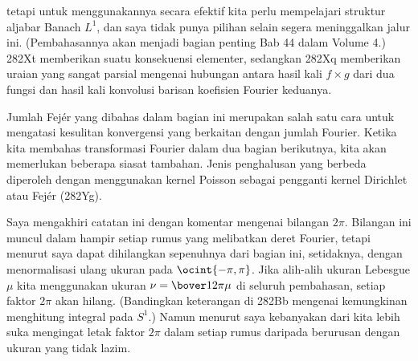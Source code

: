 {

\noindent tetapi untuk menggunakannya secara efektif kita perlu mempelajari struktur
aljabar Banach $L^1$, dan saya tidak punya pilihan selain segera meninggalkan
jalur ini. (Pembahasannya akan menjadi bagian penting Bab 44 dalam
Volume 4.)   282Xt memberikan suatu
konsekuensi elementer, sedangkan 282Xq memberikan uraian yang sangat parsial mengenai
hubungan antara hasil kali $f\times g$ dari dua fungsi dan
hasil kali konvolusi barisan koefisien Fourier keduanya.

Jumlah Fej\'er yang dibahas dalam bagian ini merupakan salah satu cara untuk mengatasi
kesulitan konvergensi yang berkaitan dengan jumlah Fourier.   Ketika
kita membahas transformasi Fourier dalam dua bagian berikutnya, kita akan memerlukan
beberapa siasat tambahan.   Jenis penghalusan yang berbeda
diperoleh dengan menggunakan kernel Poisson sebagai pengganti kernel Dirichlet atau Fej\'er
(282Yg).

Saya mengakhiri catatan ini dengan komentar mengenai bilangan $2\pi$. Bilangan ini muncul dalam
hampir setiap rumus yang melibatkan deret Fourier, tetapi menurut saya dapat
dihilangkan sepenuhnya dari bagian ini, setidaknya, dengan menormalisasi ulang
ukuran pada $\ocint{-\pi,\pi}$. Jika alih-alih ukuran Lebesgue
$\mu$ kita menggunakan ukuran $\nu=\bover1{2\pi}\mu$ di seluruh pembahasan, setiap faktor
$2\pi$ akan hilang. (Bandingkan keterangan di 282Bb mengenai
kemungkinan menghitung integral pada $S^1$.) Namun menurut saya kebanyakan dari kita
lebih suka mengingat letak faktor $2\pi$ dalam setiap rumus daripada
berurusan dengan ukuran yang tidak lazim.
}%

\discrpage
